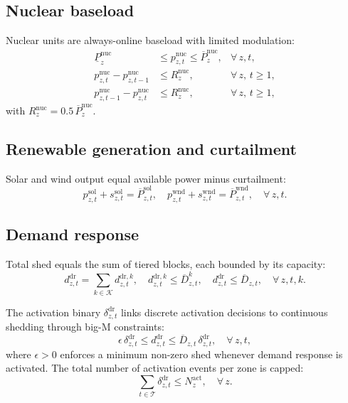 \documentclass{article}
\begin{document}
\subsection{Nuclear baseload}

Nuclear units are always-online baseload with limited modulation:
\begin{align}
\underline{P}^{\mathrm{nuc}}_z
&\leq p^{\mathrm{nuc}}_{z,t}
\leq \overline{P}^{\mathrm{nuc}}_z,
& \forall\, z,t, \label{eq:nuclear_bounds} \\
p^{\mathrm{nuc}}_{z,t} - p^{\mathrm{nuc}}_{z,t-1}
&\leq R^{\mathrm{nuc}}_z,
& \forall\, z,\, t \geq 1, \label{eq:nuclear_ramp_up} \\
p^{\mathrm{nuc}}_{z,t-1} - p^{\mathrm{nuc}}_{z,t}
&\leq R^{\mathrm{nuc}}_z,
& \forall\, z,\, t \geq 1, \label{eq:nuclear_ramp_down}
\end{align}
with $R^{\mathrm{nuc}}_z = 0.5\,\overline{P}^{\mathrm{nuc}}_z$.

\subsection{Renewable generation and curtailment}

Solar and wind output equal available power minus curtailment:
\begin{equation}
p^{\mathrm{sol}}_{z,t} + s^{\mathrm{sol}}_{z,t} = \overline{P}^{\mathrm{sol}}_{z,t}, \quad
p^{\mathrm{wnd}}_{z,t} + s^{\mathrm{wnd}}_{z,t} = \overline{P}^{\mathrm{wnd}}_{z,t}, \quad \forall\, z,t.
\label{eq:renewable_balance}
\end{equation}

\subsection{Demand response}

Total shed equals the sum of tiered blocks, each bounded by its capacity:
\begin{equation}
d^{\mathrm{dr}}_{z,t}
= \textstyle\sum_{k \in \mathcal{K}} d^{\mathrm{dr},k}_{z,t}, \quad
d^{\mathrm{dr},k}_{z,t} \leq \overline{D}^{k}_{z,t}, \quad
d^{\mathrm{dr}}_{z,t} \leq \overline{D}_{z,t},
\quad \forall\, z,t,k.
\label{eq:dr_blocks}
\end{equation}

The activation binary $\delta^{\mathrm{dr}}_{z,t}$ links discrete activation decisions to
continuous shedding through big-M constraints:
\begin{equation}
\epsilon \, \delta^{\mathrm{dr}}_{z,t}
\leq d^{\mathrm{dr}}_{z,t}
\leq \overline{D}_{z,t} \, \delta^{\mathrm{dr}}_{z,t},
\quad \forall\, z,t,
\label{eq:dr_activation}
\end{equation}
where $\epsilon > 0$ enforces a minimum non-zero shed whenever demand response is activated.
The total number of activation events per zone is capped:
\begin{equation}
\textstyle\sum_{t \in \mathcal{T}} \delta^{\mathrm{dr}}_{z,t}
\leq N^{\mathrm{act}}_z,
\quad \forall\, z.
\label{eq:dr_max_activations}
\end{equation}
\end{document}
